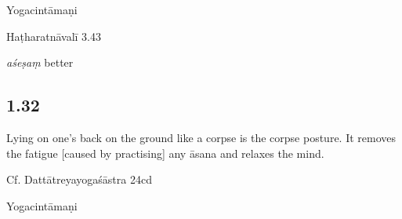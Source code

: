 \begin{ekdosis}
\begin{testimonia}[hp01_031]
Yogacintāmaṇi

\begin{versinnote}
\end{versinnote}

Haṭharatnāvalī 3.43

\begin{versinnote}
\end{versinnote}

\end{testimonia}

\begin{philcomm}[hp01_031]
\emph{aśeṣaṃ} better
\end{philcomm}

\subsection*{1.32}
\begin{translation}[hp01_032]
Lying on one’s back on the ground like a corpse is the corpse posture. It removes the fatigue [caused by practising] any āsana and relaxes the mind.
\end{translation}

\begin{sources}[hp01_032]
Cf. Dattātreyayogaśāstra 24cd

\begin{versinnote}
\end{versinnote}

\end{sources}

\begin{testimonia}[hp01_032]
Yogacintāmaṇi


\end{testimonia}
\end{ekdosis}
